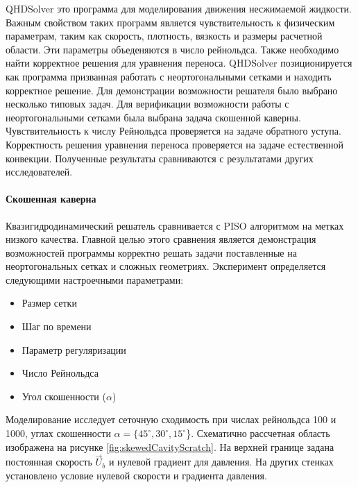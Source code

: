 QHDSolver это программа для моделирования движения несжимаемой жидкости. Важным свойством таких программ является чувствительность к физическим параметрам, таким как скорость, плотность, вязкость и размеры расчетной области. Эти параметры объеденяются в число рейнольдса. Также необходимо найти корректное решения для уравнения переноса. QHDSolver позиционируется как программа призванная работать с неортогональными сетками и находить корректное решение. Для демонстрации возможности решателя было выбрано несколько типовых задач. Для верификации возможности работы с неортогональными сетками была выбрана задача скошенной каверны. Чувствительность к числу Рейнольдса проверяется на задаче обратного уступа. Корректность решения уравнения переноса проверяется на задаче естественной конвекции. Полученные результаты сравниваются с результатами других исследователей.

\paragraph{Скошенная каверна}

Квазигидродинамический решатель сравнивается с PISO алгоритмом на метках низкого качества. Главной целью этого сравнения является демонстрация возможностей программы корректно решать задачи поставленные на неортогональных сетках и сложных геометриях. Эксперимент определяется следующими настроечными параметрами:

\begin{itemize}
    \item Размер сетки
    \item Шаг по времени
    \item Параметр регуляризации
    \item Число Рейнольдса
    \item Угол скошенности ($\alpha$)
\end{itemize}

Моделирование исследует сеточную сходимость при числах рейнольдса 100 и 1000, углах скошенности $\alpha = \{45^{\circ}, 30^{\circ}, 15^{\circ}$\}. Схематично рассчетная область изображена на рисунке \ref{fig:skewedCavityScratch}. На верхней границе задана постоянная скорость $\vec{U}_b$ и нулевой градиент для давления. На других стенках установлено условие нулевой скорости и градиента давления.

